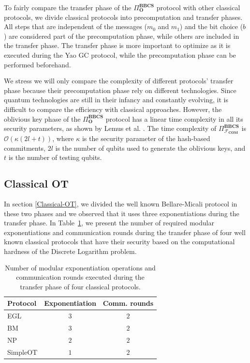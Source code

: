 
To fairly compare the transfer phase of the $\Pi^{\textbf{BBCS}}_{\textbf{O}}$ protocol with other classical protocols, we divide classical protocols into precomputation and transfer phases. All steps that are independent of the messages ($m_0$ and $m_1$) and the bit choice ($b$) are considered part of the precomputation phase, while others are included in the transfer phase. The transfer phase is more important to optimize as it is executed during the Yao GC protocol, while the precomputation phase can be performed beforehand.

We stress we will only compare the complexity of different protocols' transfer phase because their precomputation phase rely on different technologies. Since quantum technologies are still in their infancy and constantly evolving, it is difficult to compare the efficiency with classical approaches. However, the oblivious key phase of the $\Pi^{\textbf{BBCS}}_{\textbf{O}}$ protocol has a linear time complexity in all its security parameters, as shown by Lemus et al. \cite{Lemus20}. The time complexity of $\Pi^{\textbf{BBCS}}_{\mathcal{F}_{\textbf{COM}}}$ is $\mathcal{O}(\kappa(2l + t))$, where $\kappa$ is the security parameter of the hash-based commitments, $2l$ is the number of qubits used to generate the oblivious keys, and $t$ is the number of testing qubits.

\subsection{Classical OT} \label{C-OT_comp}

In section \ref{Classical-OT}, we divided the well known Bellare-Micali protocol in these two phases and we observed that it uses three exponentiations during the transfer phase. In Table~\ref{table:ClassicalOT_comparison}, we present the number of required modular exponentiations and communication rounds during the transfer phase of four well known classical protocols that have their security based on the computational hardness of the Discrete Logarithm problem. 

\begin{table}[h!]
\centering
\begin{tabular}{lcc}
\toprule
Protocol & Exponentiation & Comm. rounds \\
\midrule
EGL \cite{EGL85}      & $3$              & $2$\\ 
BM  \cite{BM89}     & $3$              & $2$ \\ 
NP  \cite{NP01}     & $2$             & $2$  \\ 
SimpleOT \cite{CO15} & $1$              & $2$           \\
\bottomrule
\end{tabular}
\caption{Number of modular exponentiation operations and communication rounds executed during the transfer phase of four classical protocols.}
\label{table:ClassicalOT_comparison}
\end{table}

